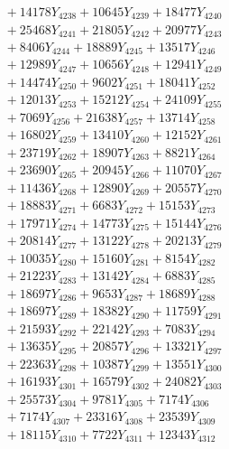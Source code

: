 \documentclass[a4paper,10pt]{article}
\begin{document}
{\begin{align}
&\;  + 14178 Y_{4238} + 10645 Y_{4239} + 18477 Y_{4240} \\[0.3ex]
&\;  + 25468 Y_{4241} + 21805 Y_{4242} + 20977 Y_{4243} \\[0.3ex]
&\;  + 8406 Y_{4244} + 18889 Y_{4245} + 13517 Y_{4246} \\[0.3ex]
&\;  + 12989 Y_{4247} + 10656 Y_{4248} + 12941 Y_{4249} \\[0.3ex]
&\;  + 14474 Y_{4250} + 9602 Y_{4251} + 18041 Y_{4252} \\[0.3ex]
&\;  + 12013 Y_{4253} + 15212 Y_{4254} + 24109 Y_{4255} \\[0.3ex]
&\;  + 7069 Y_{4256} + 21638 Y_{4257} + 13714 Y_{4258} \\[0.5ex]\allowbreak
&\;  + 16802 Y_{4259} + 13410 Y_{4260} + 12152 Y_{4261} \\[0.3ex]
&\;  + 23719 Y_{4262} + 18907 Y_{4263} + 8821 Y_{4264} \\[0.3ex]
&\;  + 23690 Y_{4265} + 20945 Y_{4266} + 11070 Y_{4267} \\[0.3ex]
&\;  + 11436 Y_{4268} + 12890 Y_{4269} + 20557 Y_{4270} \\[0.3ex]
&\;  + 18883 Y_{4271} + 6683 Y_{4272} + 15153 Y_{4273} \\[0.3ex]
&\;  + 17971 Y_{4274} + 14773 Y_{4275} + 15144 Y_{4276} \\[0.3ex]
&\;  + 20814 Y_{4277} + 13122 Y_{4278} + 20213 Y_{4279} \\[0.3ex]
&\;  + 10035 Y_{4280} + 15160 Y_{4281} + 8154 Y_{4282} \\[0.3ex]
&\;  + 21223 Y_{4283} + 13142 Y_{4284} + 6883 Y_{4285} \\[0.3ex]
&\;  + 18697 Y_{4286} + 9653 Y_{4287} + 18689 Y_{4288} \\[0.5ex]\allowbreak
&\;  + 18697 Y_{4289} + 18382 Y_{4290} + 11759 Y_{4291} \\[0.3ex]
&\;  + 21593 Y_{4292} + 22142 Y_{4293} + 7083 Y_{4294} \\[0.3ex]
&\;  + 13635 Y_{4295} + 20857 Y_{4296} + 13321 Y_{4297} \\[0.3ex]
&\;  + 22363 Y_{4298} + 10387 Y_{4299} + 13551 Y_{4300} \\[0.3ex]
&\;  + 16193 Y_{4301} + 16579 Y_{4302} + 24082 Y_{4303} \\[0.3ex]
&\;  + 25573 Y_{4304} + 9781 Y_{4305} + 7174 Y_{4306} \\[0.3ex]
&\;  + 7174 Y_{4307} + 23316 Y_{4308} + 23539 Y_{4309} \\[0.3ex]
&\;  + 18115 Y_{4310} + 7722 Y_{4311} + 12343 Y_{4312} \\[0.3ex]

\end{align}}
\end{document}
